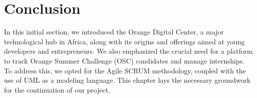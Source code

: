 \section{Conclusion}
In this initial section, we introduced the Orange Digital Center, a major
technological hub in Africa, along with its origins and offerings aimed at
young developers and entrepreneurs. We also emphasized the crucial need for a
platform to track Orange Summer Challenge (OSC) candidates and manage
internships. To address this, we opted for the Agile SCRUM methodology, coupled
with the use of UML as a modeling language. This chapter lays the necessary
groundwork for the continuation of our project.

